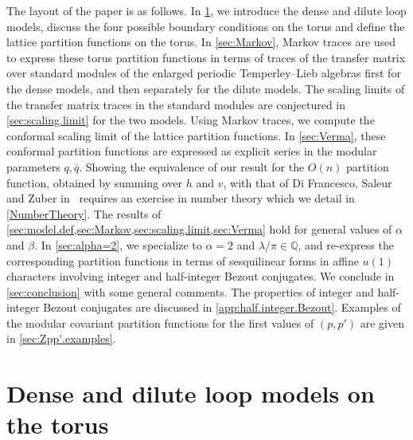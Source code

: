 \documentclass[11pt]{article}
\numberwithin{equation}{section}
\theoremstyle{definition}
\numberwithin{equation}{section}
\begin{document}
The layout of the paper is as follows. In \cref{sec:model.def}, we introduce the dense and dilute loop models, discuss the four possible boundary conditions on the torus and define the lattice partition functions on the torus. In \cref{sec:Markov}, Markov traces are used to express these torus partition functions in terms of traces of the transfer matrix over standard modules of the enlarged periodic Temperley--Lieb algebras first for the dense models, and then separately for the dilute models. The scaling limits of the transfer matrix traces in the standard modules are conjectured in \cref{sec:scaling.limit}  for the two models. Using Markov traces, we compute the conformal scaling limit of the lattice partition functions. In \cref{sec:Verma}, these conformal partition functions are expressed as explicit series in the modular parameters $q,\bar q$. Showing the equivalence of our result for the $O(n)$ partition function, obtained by summing over $h$ and $v$, with that of Di Francesco, Saleur and Zuber in~\cite{FSZ87} requires an exercise in number theory which we detail in \cref{NumberTheory}. The results of \cref{sec:model.def,sec:Markov,sec:scaling.limit,sec:Verma} hold for general values of $\alpha$ and $\beta$. In \cref{sec:alpha=2}, we specialize to $\alpha=2$ and $\lambda/\pi\in\mathbb{Q}$, and re-express the corresponding partition functions in terms of sesquilinear forms in affine $u(1)$ characters involving integer and half-integer Bezout conjugates. We conclude in \cref{sec:conclusion} with some general comments. The properties of integer and half-integer Bezout conjugates are discussed in \cref{app:half.integer.Bezout}. Examples of the modular covariant partition functions for the first values of $(p,p')$ are given in \cref{sec:Zpp'.examples}.


%
\section{Dense and dilute loop models on the torus}\label{sec:model.def}
%
\end{document}
